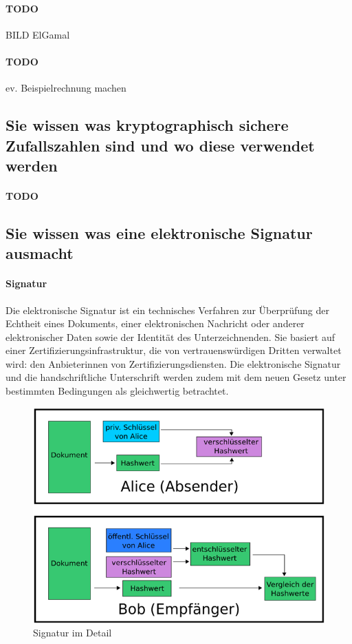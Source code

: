 \documentclass[10pt,a4paper]{article}
\begin{document}
\paragraph*{TODO}BILD ElGamal

\paragraph*{TODO}ev. Beispielrechnung machen

\subsection*{Sie wissen was kryptographisch sichere Zufallszahlen sind und wo diese verwendet werden}

\paragraph*{TODO}

\subsection*{Sie wissen was eine elektronische Signatur ausmacht}

\paragraph*{Signatur}Die elektronische Signatur ist ein technisches Verfahren zur Überprüfung der Echtheit eines Dokuments, einer elektronischen Nachricht oder anderer elektronischer Daten sowie der Identität des Unterzeichnenden. Sie basiert auf einer Zertifizierungsinfrastruktur, die von vertrauenswürdigen Dritten verwaltet wird: den Anbieterinnen von Zertifizierungsdiensten. Die elektronische Signatur und die handschriftliche Unterschrift werden zudem mit dem neuen Gesetz unter bestimmten Bedingungen als gleichwertig betrachtet.
\begin{figure}[H]
    \begin{center}
    \includegraphics[width=12cm]{images/digisignatur1.png}
    \caption{Signatur im Detail}
    \label{digisig1}
    \end{center}
\end{figure}
\end{document}
